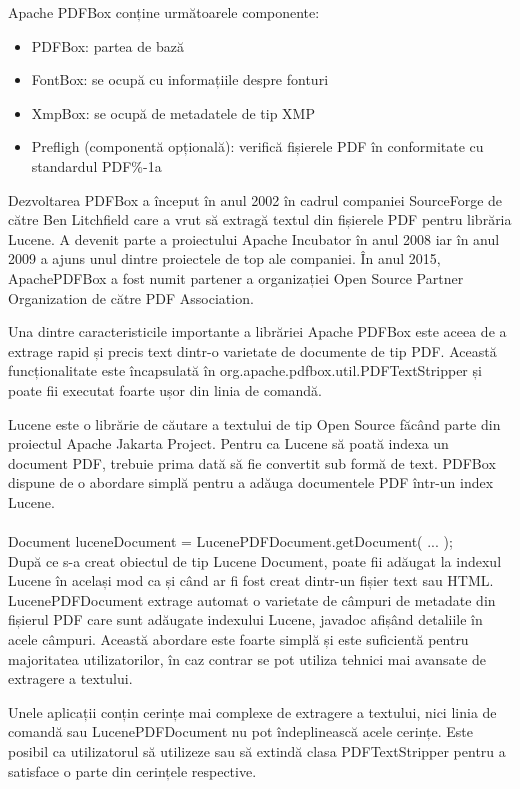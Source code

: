 \documentclass[12pt]{book}
\begin{document}
Apache PDFBox conține următoarele componente:
\begin{addmargin}[4em]{1em}
	\begin{itemize}
		\item PDFBox: partea de bază
		\item FontBox: se ocupă cu informațiile despre fonturi
		\item XmpBox: se ocupă de metadatele de tip XMP
		\item Prefligh (componentă opțională): verifică fișierele PDF în conformitate cu standardul PDF\%-1a 
\end{itemize}
\end{addmargin}

Dezvoltarea PDFBox a început în anul 2002 în cadrul companiei SourceForge de către Ben Litchfield care a vrut să extragă textul din fișierele PDF pentru librăria Lucene. A devenit parte a proiectului Apache Incubator în anul 2008 iar în anul 2009 a ajuns unul dintre proiectele de top ale companiei. În anul 2015, ApachePDFBox a fost numit partener a organizației Open Source Partner Organization de către PDF Association.

Una dintre caracteristicile importante a librăriei Apache PDFBox este aceea de a extrage rapid și precis text dintr-o varietate de documente de tip PDF. Această funcționalitate este încapsulată în org.apache.pdfbox.util.PDFTextStripper și poate fii executat foarte ușor din linia de comandă. 

Lucene este o librărie de căutare a textului de tip Open Source făcând parte din proiectul Apache Jakarta Project. Pentru ca Lucene să poată indexa un document PDF, trebuie prima dată să fie convertit sub formă de text. PDFBox dispune de o abordare simplă pentru a adăuga documentele PDF într-un index Lucene.\\
\\
Document luceneDocument = LucenePDFDocument.getDocument( ... );\\

După ce s-a creat obiectul de tip Lucene Document, poate fii adăugat la indexul Lucene în același mod ca și când ar fi fost creat dintr-un fișier text sau HTML. LucenePDFDocument extrage automat o varietate de câmpuri de metadate din fișierul PDF care sunt adăugate indexului Lucene, javadoc afișând detaliile în acele câmpuri. Această abordare este foarte simplă și este suficientă pentru majoritatea utilizatorilor, în caz contrar se pot utiliza tehnici mai avansate de extragere a textului.

Unele aplicații conțin cerințe mai complexe de extragere a textului, nici linia de comandă sau LucenePDFDocument nu pot îndeplinească acele cerințe. Este posibil ca utilizatorul să utilizeze sau să extindă clasa PDFTextStripper pentru a satisface o parte din cerințele respective. 
\end{document}
